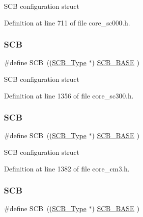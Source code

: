 S\+CB configuration struct 

Definition at line 711 of file core\+\_\+sc000.\+h.

\mbox{\label{group___c_m_s_i_s__core__base_gaaaf6477c2bde2f00f99e3c2fd1060b01}} 
\subsubsection{\texorpdfstring{S\+CB}{SCB}\hspace{0.1cm}{\footnotesize\ttfamily [4/7]}}
{\footnotesize\ttfamily \#define S\+CB~((\hyperlink{struct_s_c_b___type}{S\+C\+B\+\_\+\+Type}       $\ast$)     \hyperlink{group___c_m_s_i_s__core__base_gad55a7ddb8d4b2398b0c1cfec76c0d9fd}{S\+C\+B\+\_\+\+B\+A\+SE}      )}

S\+CB configuration struct 

Definition at line 1356 of file core\+\_\+sc300.\+h.

\mbox{\label{group___c_m_s_i_s__core__base_gaaaf6477c2bde2f00f99e3c2fd1060b01}} 
\subsubsection{\texorpdfstring{S\+CB}{SCB}\hspace{0.1cm}{\footnotesize\ttfamily [5/7]}}
{\footnotesize\ttfamily \#define S\+CB~((\hyperlink{struct_s_c_b___type}{S\+C\+B\+\_\+\+Type}       $\ast$)     \hyperlink{group___c_m_s_i_s__core__base_gad55a7ddb8d4b2398b0c1cfec76c0d9fd}{S\+C\+B\+\_\+\+B\+A\+SE}      )}

S\+CB configuration struct 

Definition at line 1382 of file core\+\_\+cm3.\+h.

\mbox{\label{group___c_m_s_i_s__core__base_gaaaf6477c2bde2f00f99e3c2fd1060b01}} 
\subsubsection{\texorpdfstring{S\+CB}{SCB}\hspace{0.1cm}{\footnotesize\ttfamily [6/7]}}
{\footnotesize\ttfamily \#define S\+CB~((\hyperlink{struct_s_c_b___type}{S\+C\+B\+\_\+\+Type}       $\ast$)     \hyperlink{group___c_m_s_i_s__core__base_gad55a7ddb8d4b2398b0c1cfec76c0d9fd}{S\+C\+B\+\_\+\+B\+A\+SE}      )}

